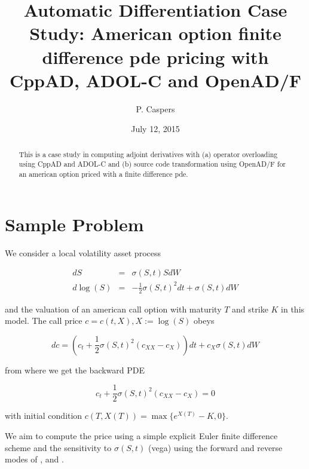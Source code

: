 \documentclass{amsart}
\theoremstyle{plain}
\numberwithin{equation}{section}
\begin{document}
\title[AD]{Automatic Differentiation Case Study: American option finite difference pde pricing with CppAD, ADOL-C and OpenAD/F}
\author{P. Caspers}
\date{July 12, 2015}
\begin{abstract}
This is a case study in computing adjoint derivatives with (a) operator overloading using CppAD \cite{CppAD} and ADOL-C \cite{ADOLC} and (b) source code transformation using OpenAD/F \cite{OpenAD} for an american option priced with a finite difference pde.
\end{abstract}

\maketitle

\tableofcontents

\section{Sample Problem}

We consider a local volatility asset process 

\begin{eqnarray}
dS &=& \sigma(S,t) S dW \\
d\log(S) &=& -\frac{1}{2}\sigma(S,t)^2 dt + \sigma(S,t) dW
\end{eqnarray}

and the valuation of an american call option with maturity $T$ and strike $K$ in this model. The call price $c = c(t,X), X:=\log(S)$ obeys

\begin{equation}
dc = \left(c_t + \frac{1}{2} \sigma(S,t)^2 (c_{XX}-c_{X}) \right) dt + c_X \sigma(S,t) dW 
\end{equation}

from where we get the backward PDE

\begin{equation}
c_t + \frac{1}{2}\sigma(S,t)^2(c_{XX}-c_X) = 0
\end{equation}

with initial condition $c(T,X(T)) = \max\{ e^{X(T)}  - K, 0 \}$.

We aim to compute the price using a simple explicit Euler finite difference scheme and the sensitivity to $\sigma(S,t)$ (vega) using the forward and reverse modes of \cite{CppAD}, \cite{ADOLC} and \cite{OpenAD}. 
\end{document}
